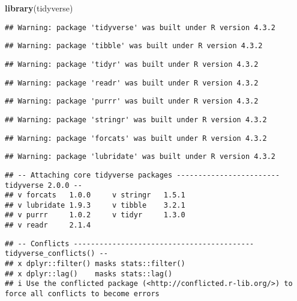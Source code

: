 \documentclass[
]{article}
\newenvironment{Shaded}{\begin{snugshade}}{\end{snugshade}}
\newcommand{\FunctionTok}[1]{\textcolor[rgb]{0.13,0.29,0.53}{\textbf{#1}}}
\newcommand{\NormalTok}[1]{#1}
\begin{document}
\begin{Shaded}
\begin{Highlighting}[]
\FunctionTok{library}\NormalTok{(tidyverse)}
\end{Highlighting}
\end{Shaded}

\begin{verbatim}
## Warning: package 'tidyverse' was built under R version 4.3.2
\end{verbatim}

\begin{verbatim}
## Warning: package 'tibble' was built under R version 4.3.2
\end{verbatim}

\begin{verbatim}
## Warning: package 'tidyr' was built under R version 4.3.2
\end{verbatim}

\begin{verbatim}
## Warning: package 'readr' was built under R version 4.3.2
\end{verbatim}

\begin{verbatim}
## Warning: package 'purrr' was built under R version 4.3.2
\end{verbatim}

\begin{verbatim}
## Warning: package 'stringr' was built under R version 4.3.2
\end{verbatim}

\begin{verbatim}
## Warning: package 'forcats' was built under R version 4.3.2
\end{verbatim}

\begin{verbatim}
## Warning: package 'lubridate' was built under R version 4.3.2
\end{verbatim}

\begin{verbatim}
## -- Attaching core tidyverse packages ------------------------ tidyverse 2.0.0 --
## v forcats   1.0.0     v stringr   1.5.1
## v lubridate 1.9.3     v tibble    3.2.1
## v purrr     1.0.2     v tidyr     1.3.0
## v readr     2.1.4
\end{verbatim}

\begin{verbatim}
## -- Conflicts ------------------------------------------ tidyverse_conflicts() --
## x dplyr::filter() masks stats::filter()
## x dplyr::lag()    masks stats::lag()
## i Use the conflicted package (<http://conflicted.r-lib.org/>) to force all conflicts to become errors
\end{verbatim}
\end{document}
